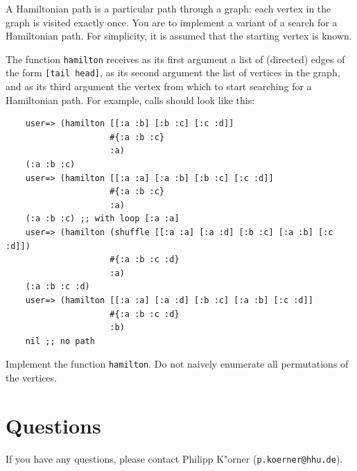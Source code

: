\documentclass[11pt,a4paper]{article}
\begin{document}
\begin{exercise}
    A Hamiltonian path is a particular path through a graph:
    each vertex in the graph is visited exactly once.
    You are to implement a variant of a search for a Hamiltonian path.
    For simplicity, it is assumed that the starting vertex is known.

	The function \verb|hamilton| receives as its first argument
	a list of (directed) edges of the form \verb|[tail head]|,
	as its second argument the list of vertices in the graph,
	and as its third argument the vertex
	from which to start searching for a Hamiltonian path.
    For example, calls should look like this:

    \begin{verbatim}
    user=> (hamilton [[:a :b] [:b :c] [:c :d]]
                     #{:a :b :c} 
                     :a)
    (:a :b :c)
    user=> (hamilton [[:a :a] [:a :b] [:b :c] [:c :d]] 
                     #{:a :b :c}
                     :a) 
    (:a :b :c) ;; with loop [:a :a]
    user=> (hamilton (shuffle [[:a :a] [:a :d] [:b :c] [:a :b] [:c :d]])
                     #{:a :b :c :d} 
                     :a)
    (:a :b :c :d)
    user=> (hamilton [[:a :a] [:a :d] [:b :c] [:a :b] [:c :d]]
                     #{:a :b :c :d} 
                     :b)
    nil ;; no path
    \end{verbatim}

    Implement the function \verb|hamilton|.
    Do not naively enumerate all permutations of the vertices.
\end{exercise}

\section*{Questions}
If you have any questions, please contact Philipp K"orner (\texttt{p.koerner@hhu.de}).
\end{document}
